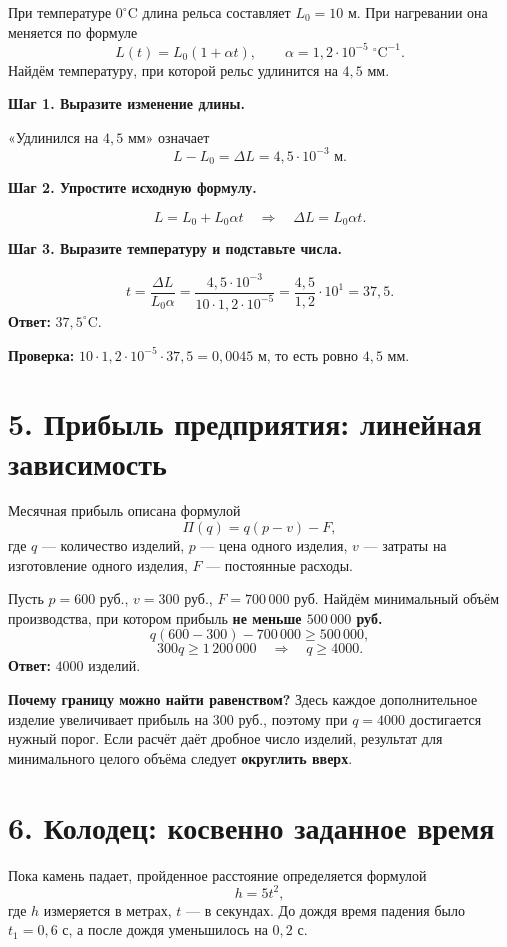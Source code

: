 \documentclass[a4paper,11pt]{article}
\newcommand{\key}[1]{\textcolor{darkaccent}{\textbf{#1}}}
\newcommand{\ex}[1]{\par\smallskip\textbf{\textcolor{accent}{#1}}\par}
\begin{document}
При температуре \(0^\circ\mathrm{C}\) длина рельса составляет \(L_0=10\) м.
При нагревании она меняется по формуле
\[
L(t)=L_0(1+\alpha t), \qquad
\alpha=1{,}2\cdot10^{-5}\;{}^\circ\mathrm{C}^{-1}.
\]
Найдём температуру, при которой рельс удлинится на \(4{,}5\) мм.

\ex{Шаг 1. Выразите изменение длины.}
«Удлинился на \(4{,}5\) мм» означает
\[
L-L_0=\Delta L=4{,}5\cdot10^{-3}\text{ м}.
\]

\ex{Шаг 2. Упростите исходную формулу.}
\[
L=L_0+L_0\alpha t
\quad\Longrightarrow\quad
\Delta L=L_0\alpha t.
\]

\ex{Шаг 3. Выразите температуру и подставьте числа.}
\[
t=\frac{\Delta L}{L_0\alpha}
 =\frac{4{,}5\cdot10^{-3}}
 {10\cdot1{,}2\cdot10^{-5}}
 =\frac{4{,}5}{1{,}2}\cdot10^{1}
 =37{,}5.
\]
\key{Ответ:} \(37{,}5^\circ\mathrm C\).

\textbf{Проверка:}
\(10\cdot1{,}2\cdot10^{-5}\cdot37{,}5=0{,}0045\) м,
то есть ровно \(4{,}5\) мм.

\section*{5. Прибыль предприятия: линейная зависимость}
Месячная прибыль описана формулой
\[
\Pi(q)=q(p-v)-F,
\]
где \(q\) --- количество изделий,
\(p\) --- цена одного изделия,
\(v\) --- затраты на изготовление одного изделия,
\(F\) --- постоянные расходы.

Пусть \(p=600\) руб., \(v=300\) руб., \(F=700\,000\) руб.
Найдём минимальный объём производства, при котором прибыль
\textbf{не меньше \(500\,000\) руб.}
\[
q(600-300)-700\,000\ge500\,000,
\]
\[
300q\ge1\,200\,000
\quad\Longrightarrow\quad q\ge4000.
\]
\key{Ответ:} \(4000\) изделий.

\textbf{Почему границу можно найти равенством?}
Здесь каждое дополнительное изделие увеличивает прибыль на \(300\) руб.,
поэтому при \(q=4000\) достигается нужный порог.
Если расчёт даёт дробное число изделий, результат для минимального
целого объёма следует \textbf{округлить вверх}.

\clearpage
\section*{6. Колодец: косвенно заданное время}

Пока камень падает, пройденное расстояние определяется формулой
\[
h=5t^2,
\]
где \(h\) измеряется в метрах, \(t\) --- в секундах.
До дождя время падения было \(t_1=0{,}6\) с,
а после дождя уменьшилось на \(0{,}2\) с.
\end{document}

